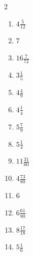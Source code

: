 \documentclass[12pt]{article}
\begin{document}
\begin{multicols}{2}
\begin{enumerate}
\item $ 4 \frac{5}{12} $
\item $ 7 $
\item $ 16 \frac{7}{72} $
\item $ 3 \frac{1}{5} $
\item $ 4 \frac{4}{9} $
\item $ 4 \frac{1}{4} $
\item $ 5 \frac{7}{9} $
\item $ 5 \frac{1}{4} $
\item $ 11 \frac{31}{60} $
\item $ 4 \frac{73}{80} $
\item $ 6 $
\item $ 6 \frac{61}{80} $
\item $ 8 \frac{17}{18} $
\item $ 5 \frac{1}{6} $
\end{enumerate}\end{multicols}\newpage
\end{document}
